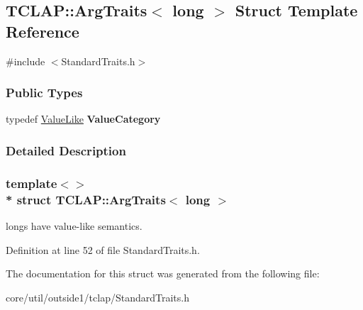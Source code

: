 \hypertarget{structTCLAP_1_1ArgTraits_3_01long_01_4}{}\subsection{T\+C\+L\+AP\+:\+:Arg\+Traits$<$ long $>$ Struct Template Reference}
\label{structTCLAP_1_1ArgTraits_3_01long_01_4}


{\ttfamily \#include $<$Standard\+Traits.\+h$>$}

\subsubsection*{Public Types}
\begin{DoxyCompactItemize}
\item 
typedef \hyperlink{structTCLAP_1_1ValueLike}{Value\+Like} {\bfseries Value\+Category}\hypertarget{structTCLAP_1_1ArgTraits_3_01long_01_4_a942d9a1e813bc3f82b51a2dcedb7316d}{}\label{structTCLAP_1_1ArgTraits_3_01long_01_4_a942d9a1e813bc3f82b51a2dcedb7316d}

\end{DoxyCompactItemize}


\subsubsection{Detailed Description}
\subsubsection*{template$<$$>$\\*
struct T\+C\+L\+A\+P\+::\+Arg\+Traits$<$ long $>$}

longs have value-\/like semantics. 

Definition at line 52 of file Standard\+Traits.\+h.



The documentation for this struct was generated from the following file\+:\begin{DoxyCompactItemize}
\item 
core/util/outside1/tclap/Standard\+Traits.\+h\end{DoxyCompactItemize}
